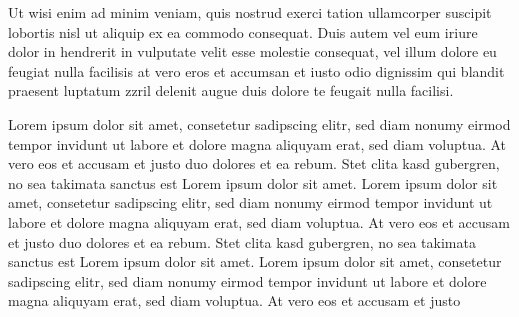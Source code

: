 \documentclass[11pt]{article}
\begin{document}
Ut wisi enim ad minim veniam, quis nostrud exerci tation ullamcorper suscipit lobortis nisl ut aliquip ex ea commodo consequat. Duis autem vel eum iriure dolor in hendrerit in vulputate velit esse molestie consequat, vel illum dolore eu feugiat nulla facilisis at vero eros et accumsan et iusto odio dignissim qui blandit praesent luptatum zzril delenit augue duis dolore te feugait nulla facilisi. 

Lorem ipsum dolor sit amet, consetetur sadipscing elitr, sed diam nonumy eirmod tempor invidunt ut labore et dolore magna aliquyam erat, sed diam voluptua. At vero eos et accusam et justo duo dolores et ea rebum. Stet clita kasd gubergren, no sea takimata sanctus est Lorem ipsum dolor sit amet. Lorem ipsum dolor sit amet, consetetur sadipscing elitr, sed diam nonumy eirmod tempor invidunt ut labore et dolore magna aliquyam erat, sed diam voluptua. At vero eos et accusam et justo duo dolores et ea rebum. Stet clita kasd gubergren, no sea takimata sanctus est Lorem ipsum dolor sit amet. Lorem ipsum dolor sit amet, consetetur sadipscing elitr, sed diam nonumy eirmod tempor invidunt ut labore et dolore magna aliquyam erat, sed diam voluptua. At vero eos et accusam et justo 

\newpage
{}

\end{document}
